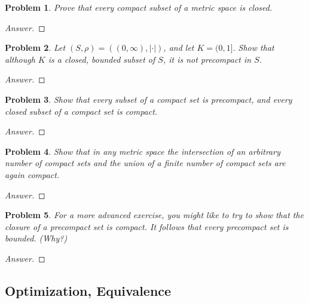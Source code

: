 \documentclass{article}
\newtheorem{problem}{Problem}
\begin{document}
\begin{problem}Prove that every compact subset of a metric space is closed.
\end{problem}

\begin{proof}[Answer]
    
\end{proof}

\begin{problem}Let $(S, \rho)=((0, \infty),|\cdot|)$, and let $K=(0,1] .$ Show that although $K$ is a closed, bounded subset of $S$, it is not precompact in $S$.
\end{problem}

\begin{proof}[Answer]
    
\end{proof}

\begin{problem} Show that every subset of a compact set is precompact, and every closed subset of a compact set is compact.
\end{problem}

\begin{proof}[Answer]
    
\end{proof}

\begin{problem} Show that in any metric space the intersection of an arbitrary number of compact sets and the union of a finite number of compact sets are again compact.
\end{problem}

\begin{proof}[Answer]
    
\end{proof}

\begin{problem} For a more advanced exercise, you might like to try to show that the closure of a precompact set is compact. It follows that every precompact set is bounded. (Why?)
\end{problem}

\begin{proof}[Answer]
    
\end{proof}

\subsection{Optimization, Equivalence}
\end{document}
